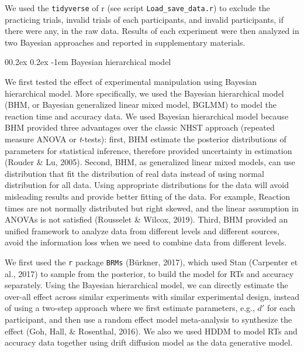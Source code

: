 \documentclass[
  english,
  man]{apa6}
\makeatletter
\let\oldparagraph\paragraph
\renewcommand{\paragraph}[1]{\oldparagraph{#1}\mbox{}}
\renewcommand{\paragraph}{\@startsection{paragraph}{4}{\parindent}%
  {0\baselineskip \@plus 0.2ex \@minus 0.2ex}%
  {-1em}%
  {\normalfont\normalsize\bfseries\itshape\typesectitle}}
\makeatother
\begin{document}
We used the \texttt{tidyverse} of r (see script \texttt{Load\_save\_data.r}) to exclude the practicing trials, invalid trials of each participants, and invalid participants, if there were any, in the raw data. Results of each experiment were then analyzed in two Bayesian approaches and reported in supplementary materials.

\hypertarget{bayesian-hierarchical-model}{%
\paragraph{Bayesian hierarchical model}\label{bayesian-hierarchical-model}}

We first tested the effect of experimental manipulation using Bayesian hierarchical model. More specifically, we used the Bayesian hierarchical model (BHM, or Bayesian generalized linear mixed model, BGLMM) to model the reaction time and accuracy data. We used Bayesian hierarchical model because BHM provided three advantages over the classic NHST approach (repeated measure ANOVA or \emph{t}-tests): first, BHM estimate the posterior distributions of parameters for statistical inference, therefore provided uncertainty in estimation (Rouder \& Lu, 2005). Second, BHM, as generalized linear mixed models, can use distribution that fit the distribution of real data instead of using normal distribution for all data. Using appropriate distributions for the data will avoid misleading results and provide better fitting of the data. For example, Reaction times are not normally distributed but right skewed, and the linear assumption in ANOVAs is not satisfied (Rousselet \& Wilcox, 2019). Third, BHM provided an unified framework to analyze data from different levels and different sources, avoid the information loss when we need to combine data from different levels.

We first used the \texttt{r} package \texttt{BRMs} (Bürkner, 2017), which used Stan (Carpenter et al., 2017) to sample from the posterior, to build the model for RTs and accuracy separately. Using the Bayesian hierarchical model, we can directly estimate the over-all effect across similar experiments with similar experimental design, instead of using a two-step approach where we first estimate parameters, e.g., \(d'\) for each participant, and then use a random effect model meta-analysis to synthesize the effect (Goh, Hall, \& Rosenthal, 2016). We also we used HDDM to model RTs and accuracy data together using drift diffusion model as the data generative model.
\end{document}
